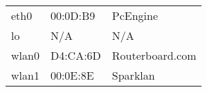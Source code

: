 \begin{tabular}{lll}
eth0 & 00:0D:B9 & PcEngine \\
lo & N/A & N/A \\
wlan0 & D4:CA:6D & Routerboard.com \\
wlan1 & 00:0E:8E & Sparklan \\
\end{tabular}
